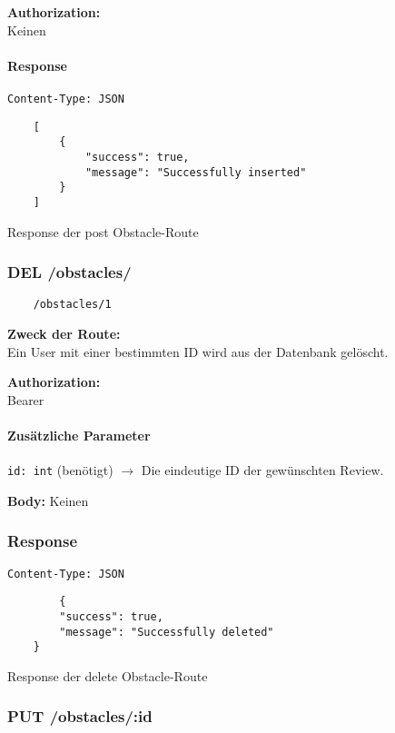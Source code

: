 \textbf{Authorization:} \\
Keinen

\paragraph{Response}
\begin{code}
    \lstinline{Content-Type: JSON}
    \begin{lstlisting}
    [
        {
            "success": true,
            "message": "Successfully inserted"
        }
    ]
    \end{lstlisting}
    \caption{Response der post Obstacle-Route}
\end{code}

\pagebreak


\subsubsection{DEL /obstacles/}

\begin{lstlisting}
    /obstacles/1
\end{lstlisting}

\textbf{Zweck der Route:} \\
Ein User mit einer bestimmten ID wird aus der Datenbank gelöscht.

\textbf{Authorization:} \\
Bearer

\paragraph{Zusätzliche Parameter}
\lstinline{id: int} (benötigt)
$\rightarrow$ Die eindeutige ID der gewünschten Review.

\textbf{Body:}
Keinen


\subsubsection{Response}
\begin{code}
    \lstinline{Content-Type: JSON}
    \begin{lstlisting}
        {
        "success": true,
        "message": "Successfully deleted"
    }
    \end{lstlisting}
    \caption{Response der delete Obstacle-Route}
\end{code}

\pagebreak


\subsubsection{PUT /obstacles/:id}

